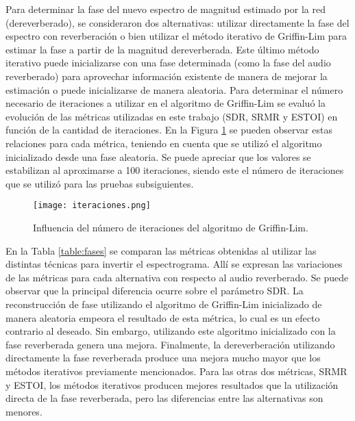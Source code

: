 Para determinar la fase del nuevo espectro de magnitud estimado por la red (dereverberado), se consideraron dos alternativas: utilizar directamente la fase del espectro con reverberación o bien utilizar el método iterativo de Griffin-Lim para estimar la fase a partir de la magnitud dereverberada. Este último método iterativo puede inicializarse con una fase determinada (como la fase del audio reverberado) para aprovechar información existente de manera de mejorar la estimación o puede inicializarse de manera aleatoria. 
Para determinar el número necesario de iteraciones a utilizar en el algoritmo de Griffin-Lim se evaluó la evolución de las métricas utilizadas en este trabajo (SDR, SRMR y ESTOI) en función de la cantidad de iteraciones. En la Figura \ref{fig:iteraciones} se pueden observar estas relaciones para cada métrica, teniendo en cuenta que se utilizó el algoritmo inicializado desde una fase aleatoria. Se puede apreciar que los valores se estabilizan al aproximarse a 100 iteraciones, siendo este el número de iteraciones que se utilizó para las pruebas subsiguientes.     

\begin{figure}[H]
	\centering{}
	\texttt{[image: iteraciones.png]}
	\caption{Influencia del número de iteraciones del algoritmo de Griffin-Lim.}
	\label{fig:iteraciones}
\end{figure}

En la Tabla \ref{table:fases} se comparan las métricas obtenidas al utilizar las distintas técnicas para invertir el espectrograma. Allí se expresan las variaciones de las métricas para cada alternativa con respecto al audio reverberado. Se puede observar que la principal diferencia ocurre sobre el parámetro SDR. La reconstrucción de fase utilizando el algoritmo de Griffin-Lim inicializado de manera aleatoria empeora el resultado de esta métrica, lo cual es un efecto contrario al deseado. Sin embargo, utilizando este algoritmo inicializado con la fase reverberada genera una mejora. Finalmente, la dereverberación utilizando directamente la fase reverberada produce una mejora mucho mayor que los métodos iterativos previamente mencionados. Para las otras dos métricas, SRMR y ESTOI, los métodos iterativos producen mejores resultados que la utilización directa de la fase reverberada, pero las diferencias entre las alternativas son menores.

